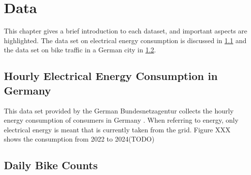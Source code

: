 \newpage
\section{Data}
\label{ch:Data}

This chapter gives a brief introduction to each dataset, and important aspects are highlighted. The data set on electrical energy consumption is discussed in \cref{sec:Data:EnergyConsumption} and the data set on bike traffic in a German city in \cref{sec:Data:BikeCounts}.

\subsection{Hourly Electrical Energy Consumption in Germany}
\label{sec:Data:EnergyConsumption}

This data set provided by the German Bundesnetzagentur collects the hourly energy consumption of consumers in Germany \parencite{noauthor_smard_nodate}. When referring to energy, only electrical energy is meant that is currently taken from the grid. Figure XXX shows the consumption from 2022 to 2024(TODO)

\subsection{Daily Bike Counts}
\label{sec:Data:BikeCounts}
